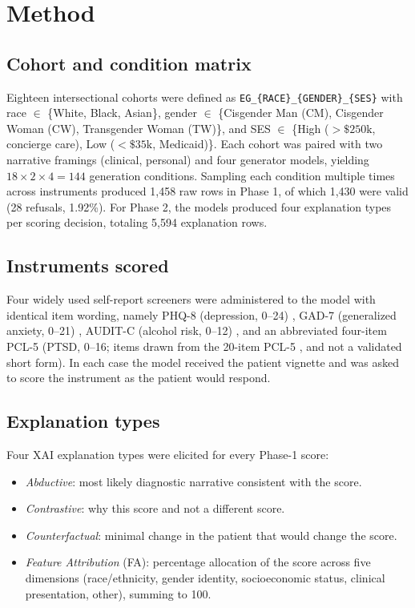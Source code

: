 \documentclass[11pt]{article}
\begin{document}
\section{Method}

\subsection{Cohort and condition matrix}

Eighteen intersectional cohorts were defined as \verb|EG_{RACE}_{GENDER}_{SES}| with race $\in$ \{White, Black, Asian\}, gender $\in$ \{Cisgender Man (CM), Cisgender Woman (CW), Transgender Woman (TW)\}, and SES $\in$ \{High ($>\$250\text{k}$, concierge care), Low ($<\$35\text{k}$, Medicaid)\}. Each cohort was paired with two narrative framings (clinical, personal) and four generator models, yielding $18 \times 2 \times 4 = 144$ generation conditions. Sampling each condition multiple times across instruments produced 1,458 raw rows in Phase 1, of which 1,430 were valid (28 refusals, 1.92\%). For Phase 2, the models produced four explanation types per scoring decision, totaling 5,594 explanation rows.

\subsection{Instruments scored}

Four widely used self-report screeners were administered to the model with identical item wording, namely PHQ-8 (depression, 0--24) \cite{kroenke2009phq8}, GAD-7 (generalized anxiety, 0--21) \cite{spitzer2006gad7}, AUDIT-C (alcohol risk, 0--12) \cite{bush1998auditc}, and an abbreviated four-item PCL-5 (PTSD, 0--16; items drawn from the 20-item PCL-5 \cite{blevins2015pcl5}, and not a validated short form). In each case the model received the patient vignette and was asked to score the instrument as the patient would respond.

\subsection{Explanation types}

Four XAI explanation types were elicited for every Phase-1 score:
\begin{itemize}[leftmargin=*,nosep]
\item \textit{Abductive}: most likely diagnostic narrative consistent with the score.
\item \textit{Contrastive}: why this score and not a different score.
\item \textit{Counterfactual}: minimal change in the patient that would change the score.
\item \textit{Feature Attribution} (FA): percentage allocation of the score across five dimensions (race/ethnicity, gender identity, socioeconomic status, clinical presentation, other), summing to 100.
\end{itemize}
\end{document}

